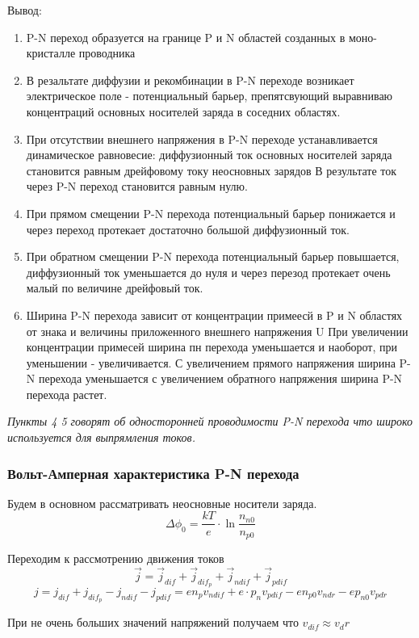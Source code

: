 \documentclass[../main.tex]{subfiles}
\begin{document}
Вывод:
\begin{enumerate}
    \item P-N переход образуется на границе P и N областей созданных в моно-кристалле проводника
    \item В резальтате диффузии и рекомбинации в P-N переходе возникает электрическое поле - потенциальный барьер, препятсвующий
    выравниваю концентраций основных носителей заряда в соседних областях.
    \item При отсутствии внешнего напряжения в P-N переходе устанавливается динамическое равновесие: диффузионный ток основных носителей заряда становится равным дрейфовому току неосновных зарядов
    В результате ток через P-N переход становится равным нулю.
    \item При прямом смещении P-N перехода потенциальный барьер понижается и через переход протекает достаточно большой диффузионный ток.
    \item При обратном смещении P-N перехода потенциальный барьер повышается, диффузионный ток уменьшается до нуля и через перезод протекает очень малый по величине дрейфовый ток.
    \item Ширина P-N перехода зависит от концентрации примеесй в P и N областях от знака и величины приложенного внешнего напряжения U
    При увеличении концентрации примесей ширина пн перехода уменьшается и наоборот, при уменьшении - увеличивается. С увеличением прямого напряжения ширина P-N перехода уменьшается с увеличением 
    обратного напряжения ширина P-N перехода растет.
\end{enumerate}

\textit{Пункты 4 5 говорят об односторонней проводимости P-N перехода что широко используется для выпрямления токов.}


\subsubsection{Вольт-Амперная характеристика P-N перехода}
Будем в основном рассматривать неосновные носители заряда. 
\[\Delta \phi_0 = \frac{kT}{e} \cdot \ln{\frac{n_{n0}}{n_{p0}}}\]

Переходим к рассмотрению движения токов
\[  \vec j = \vec j_{dif} + \vec j_{dif_p} + \vec j_{ndif} + \vec j_{pdif}\]
\[ j = j_{dif} +  j_{dif_p} - j_{ndif} - j_{pdif} =  e n_p v_{ndif} + e \cdot p_n v_{pdif} - en_{p0} v_{ndr} - e p_{n0} v_{pdr}\]

При не очень больших значений напряжений получаем что $v_{dif} \approx v_dr$
\end{document}
